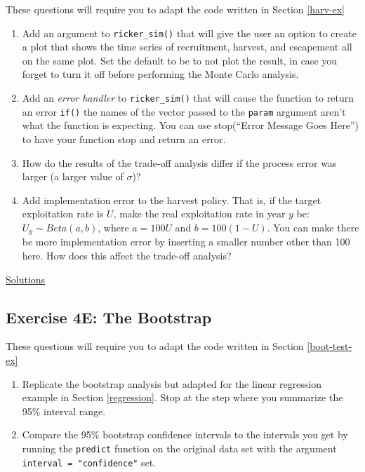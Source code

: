 \documentclass[]{book}
\providecommand{\tightlist}{%
  \setlength{\itemsep}{0pt}\setlength{\parskip}{0pt}}
\theoremstyle{definition}
\theoremstyle{definition}
\theoremstyle{definition}
\theoremstyle{remark}
\begin{document}
These questions will require you to adapt the code written in Section
\ref{harv-ex}

\begin{enumerate}
\def\labelenumi{\arabic{enumi}.}
\tightlist
\item
  Add an argument to \texttt{ricker\_sim()} that will give the user an
  option to create a plot that shows the time series of recruitment,
  harvest, and escapement all on the same plot. Set the default to be to
  not plot the result, in case you forget to turn it off before
  performing the Monte Carlo analysis.
\item
  Add an \emph{error handler} to \texttt{ricker\_sim()} that will cause
  the function to return an error \texttt{if()} the names of the vector
  passed to the \texttt{param} argument aren't what the function is
  expecting. You can use stop(``Error Message Goes Here'') to have your
  function stop and return an error.
\item
  How do the results of the trade-off analysis differ if the process
  error was larger (a larger value of \(\sigma\))?
\item
  Add implementation error to the harvest policy. That is, if the target
  exploitation rate is \(U\), make the real exploitation rate in year
  \(y\) be: \(U_y \sim Beta(a,b)\), where \(a = 100U\) and
  \(b = 100(1-U)\). You can make there be more implementation error by
  inserting a smaller number other than 100 here. How does this affect
  the trade-off analysis?
\end{enumerate}

\protect\hyperlink{ex4d-answers}{Solutions}

\subsection*{Exercise 4E: The
Bootstrap}\label{exercise-4e-the-bootstrap}

These questions will require you to adapt the code written in Section
\ref{boot-test-ex}

\begin{enumerate}
\def\labelenumi{\arabic{enumi}.}
\tightlist
\item
  Replicate the bootstrap analysis but adapted for the linear regression
  example in Section \ref{regression}. Stop at the step where you
  summarize the 95\% interval range.
\item
  Compare the 95\% bootstrap confidence intervals to the intervals you
  get by running the \texttt{predict} function on the original data set
  with the argument \texttt{interval\ =\ "confidence"} set.
\end{enumerate}
\end{document}
